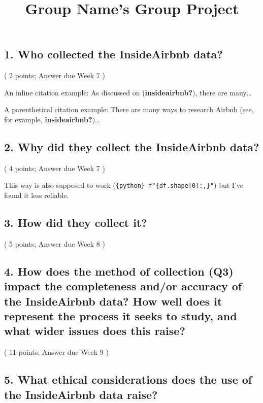 \documentclass[
  a4paper,
  DIV=11,
  numbers=noendperiod]{scrartcl}
\title{Group Name's Group Project}
\author{}
\date{}
\begin{document}
\maketitle


\subsection{1. Who collected the InsideAirbnb
data?}\label{who-collected-the-insideairbnb-data}

( 2 points; Answer due Week 7 )

An inline citation example: As discussed on (\textbf{insideairbnb?}),
there are many\ldots{}

A parenthetical citation example: There are many ways to research Airbnb
(see, for example, \textbf{insideairbnb?})\ldots{}

\subsection{2. Why did they collect the InsideAirbnb
data?}\label{why-did-they-collect-the-insideairbnb-data}

( 4 points; Answer due Week 7 )

This way is also supposed to work
(\texttt{\{python\}\ f"\{df.shape{[}0{]}:,\}"}) but I've found it less
reliable.

\subsection{3. How did they collect it?}\label{how-did-they-collect-it}

( 5 points; Answer due Week 8 )

\subsection{4. How does the method of collection (Q3) impact the
completeness and/or accuracy of the InsideAirbnb data? How well does it
represent the process it seeks to study, and what wider issues does this
raise?}\label{how-does-the-method-of-collection-q3-impact-the-completeness-andor-accuracy-of-the-insideairbnb-data-how-well-does-it-represent-the-process-it-seeks-to-study-and-what-wider-issues-does-this-raise}

( 11 points; Answer due Week 9 )

\subsection{5. What ethical considerations does the use of the
InsideAirbnb data
raise?}\label{what-ethical-considerations-does-the-use-of-the-insideairbnb-data-raise}
\end{document}
